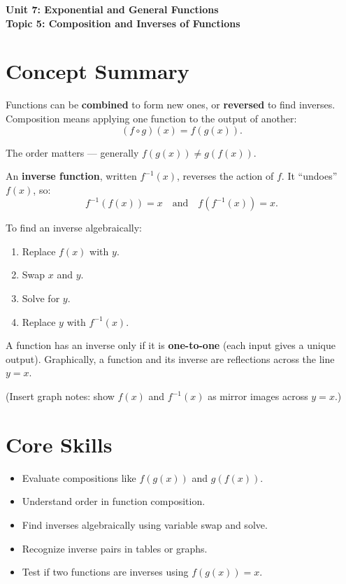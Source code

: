 \documentclass[12pt]{article}
\begin{document}
\begin{center}
    \LARGE \textbf{Unit 7: Exponential and General Functions} \\[6pt]
    \Large \textbf{Topic 5: Composition and Inverses of Functions}
\end{center}

\vspace{1em}

\section*{Concept Summary}

Functions can be \textbf{combined} to form new ones, or \textbf{reversed} to find inverses.  
Composition means applying one function to the output of another:
\[
(f \circ g)(x) = f(g(x)).
\]

The order matters — generally \(f(g(x)) \ne g(f(x))\).

An \textbf{inverse function}, written \(f^{-1}(x)\), reverses the action of \(f\).  
It “undoes” \(f(x)\), so:
\[
f^{-1}(f(x)) = x \quad \text{and} \quad f(f^{-1}(x)) = x.
\]

To find an inverse algebraically:
\begin{enumerate}
  \item Replace \(f(x)\) with \(y\).
  \item Swap \(x\) and \(y\).
  \item Solve for \(y\).
  \item Replace \(y\) with \(f^{-1}(x)\).
\end{enumerate}

A function has an inverse only if it is \textbf{one-to-one} (each input gives a unique output).  
Graphically, a function and its inverse are reflections across the line \(y = x\).

(Insert graph notes: show \(f(x)\) and \(f^{-1}(x)\) as mirror images across \(y = x\).)

\section*{Core Skills}
\begin{itemize}
  \item Evaluate compositions like \(f(g(x))\) and \(g(f(x))\).
  \item Understand order in function composition.
  \item Find inverses algebraically using variable swap and solve.
  \item Recognize inverse pairs in tables or graphs.
  \item Test if two functions are inverses using \(f(g(x)) = x\).
\end{itemize}
\end{document}
